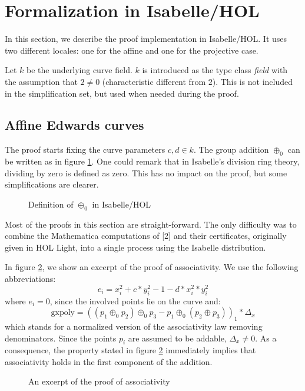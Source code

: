 \documentclass[runningheads]{llncs}
\begin{document}
\section{Formalization in Isabelle/HOL}

In this section, we describe the proof implementation in Isabelle/HOL. It uses two different locales: one for the affine and one for the projective case.

Let $k$ be the underlying curve field. $k$ is introduced as the type class \textit{field} with the assumption that $2 \neq 0$ (characteristic different from $2$). This is not included in the simplification set, but used when needed during the proof.   

\subsection{Affine Edwards curves}

The proof starts fixing the curve parameters $c,d \in k$. The group addition $\oplus_0$ can be written as in figure \ref{fig:1}. One could remark that in Isabelle's division ring theory, dividing by zero is defined as zero. This has no impact on the proof, but some simplifications are clearer.

\begin{figure}
	{}
	\caption{Definition of $\oplus_0$ in Isabelle/HOL}
	\label{fig:1}
\end{figure}

Most of the proofs in this section are straight-forward. The only difficulty was to combine the Mathematica computations of [2] and their certificates, originally given in HOL Light, into a single process using the Isabelle distribution.

In figure \ref{fig:2}, we show an excerpt of the proof of associativity. We use the following abbreviations: \[e_i = x_i^2 + c * y_i^2 - 1 - d * x_i^2 * y_i^2 \] where $e_i = 0$, since the involved points lie on the curve and: \[\text{gxpoly} = ((p_1 \oplus_0 p_2) \oplus_0 p_3 - p_1 \oplus_0 (p_2 \oplus p_3))_1*\Delta_x\] which stands for a normalized version of the associativity law removing denominators. Since the points $p_i$ are assumed to be addable, $\Delta_x \neq 0$. As a consequence, the property stated in figure \ref{fig:2} immediately implies that associativity holds in the first component of the addition.


\begin{figure}
	{}
	\caption{An excerpt of the proof of associativity}
	\label{fig:2}
\end{figure}
\end{document}
